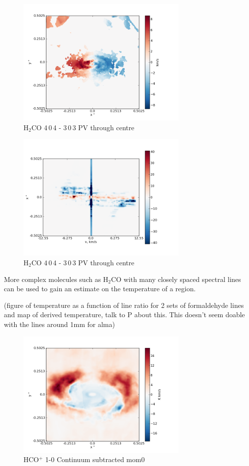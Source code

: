 \documentclass[useAMS,usenatbib]{mn2e}
\begin{document}
\begin{figure}
 \includegraphics[width=84mm]{Figures/sim/imageH2CO_4-0-4->3-0-3_30deg_mom1.png}

 \caption{H$_2$CO 4$\,$0$\,$4 - 3$\,$0$\,$3 PV through centre}
\end{figure}

\begin{figure}
 \includegraphics[width=84mm]{Figures/sim/imageH2CO_4-0-4->3-0-3_30deg_PV_centre.png}

 \caption{H$_2$CO 4$\,$0$\,$4 - 3$\,$0$\,$3 PV through centre}
\end{figure}

More complex molecules such as H$_2$CO with many closely spaced spectral lines can be used to gain an estimate on the temperature of a region. 

(figure of temperature as a function of line ratio for 2 sets of formaldehyde lines and map of derived temperature, talk to P about this. This doesn't seem doable with the lines around 1mm for alma)\newline

\begin{figure}
 \includegraphics[width=84mm]{Figures/sim/imageHCOp_1-0_30deg_contSub.png}

 \caption{HCO$^+$ 1-0 Continuum subtracted mom0}
\end{figure}
\end{document}
